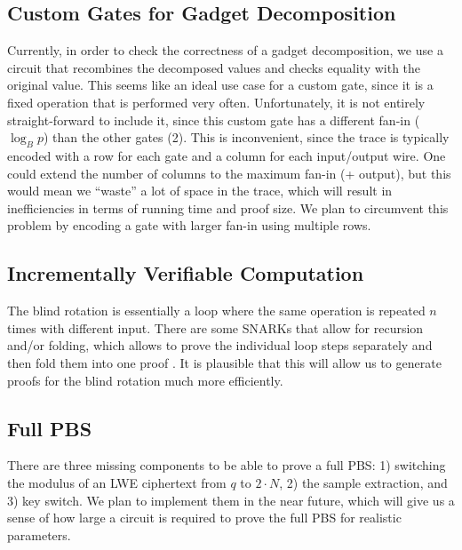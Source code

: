 \documentclass{zamarep}
\begin{document}
\subsection{Custom Gates for Gadget Decomposition}
\label{sec:gadget}
Currently, in order to check the correctness of a gadget decomposition, we use a circuit that recombines the decomposed values and checks equality with the original value. This seems like an ideal use case for a custom gate, since it is a fixed operation that is performed very often. Unfortunately, it is not entirely straight-forward to include it, since this custom gate has a different fan-in ($\log_B p$) than the other gates (2). This is inconvenient, since the trace is typically encoded with a row for each gate and a column for each input/output wire. One could extend the number of columns to the maximum fan-in (+ output), but this would mean we ``waste'' a lot of space in the trace, which will result in inefficiencies in terms of running time and proof size. We plan to circumvent this problem by encoding a gate with larger fan-in using multiple rows.

\subsection{Incrementally Verifiable Computation}
\label{sec:ivc}

The blind rotation is essentially a loop where the same operation is repeated $n$ times with different input. There are some SNARKs that allow for recursion and/or folding, which allows to prove the individual loop steps separately and then fold them into one proof \cite{sangria,cryptoeprint:2023/620,TCC:Valiant08}. It is plausible that this will allow us to generate proofs for the blind rotation much more efficiently.

\subsection{Full PBS}
\label{sec:pbs}

There are three missing components to be able to prove a full PBS: 1) switching the modulus of an LWE ciphertext from $q$ to $2 \cdot N$, 2) the sample extraction, and 3) key switch. We plan to implement them in the near future, which will give us a sense of how large a circuit is required to prove the full PBS for realistic parameters.



\end{document}
